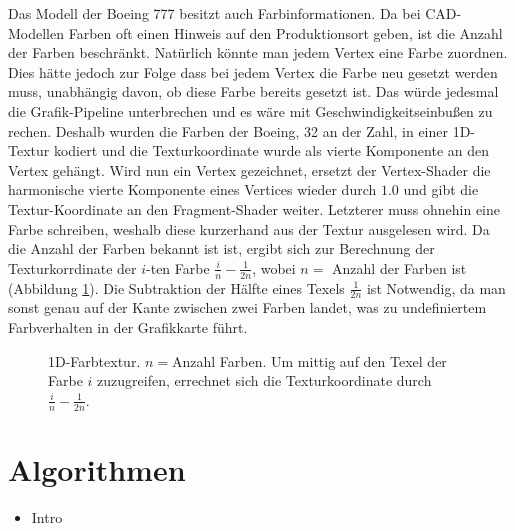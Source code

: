 Das Modell der Boeing 777 besitzt auch Farbinformationen. Da bei CAD-Modellen Farben oft einen Hinweis auf den Produktionsort geben, ist die Anzahl der Farben beschränkt. Natürlich könnte man jedem Vertex eine Farbe zuordnen. Dies hätte jedoch zur Folge dass bei jedem Vertex die Farbe neu gesetzt werden muss, unabhängig davon, ob diese Farbe bereits gesetzt ist. Das würde jedesmal die Grafik-Pipeline unterbrechen und es wäre mit Geschwindigkeitseinbußen zu rechen. Deshalb wurden die Farben der Boeing, 32 an der Zahl, in einer 1D-Textur kodiert und die Texturkoordinate wurde als vierte Komponente an den Vertex gehängt. Wird nun ein Vertex gezeichnet, ersetzt der Vertex-Shader die harmonische vierte Komponente eines Vertices wieder durch $1.0$ und gibt die Textur-Koordinate an den Fragment-Shader weiter. Letzterer muss ohnehin eine Farbe schreiben, weshalb diese kurzerhand aus der Textur ausgelesen wird. Da die Anzahl der Farben bekannt ist ist, ergibt sich zur Berechnung der Texturkorrdinate der $i$-ten Farbe $\frac{i}{n}-\frac{1}{2n}$, wobei $n=$  Anzahl der Farben ist (Abbildung \ref{fig:basics:1dtexture}). Die Subtraktion der Hälfte eines Texels $\frac{1}{2n}$ ist Notwendig, da man sonst genau auf der Kante zwischen zwei Farben landet, was zu undefiniertem Farbverhalten in der Grafikkarte führt.
\begin{figure}
  \centering
  
  \caption{1D-Farbtextur. $n=$Anzahl Farben. Um mittig auf den Texel der Farbe $i$ zuzugreifen, errechnet sich die Texturkoordinate durch $\frac{i}{n}-\frac{1}{2n}$. }
  \label{fig:basics:1dtexture}
\end{figure}

\section{Algorithmen}
\label{sec:basics:algos}
\begin{itemize}
  \item Intro
\end{itemize}

